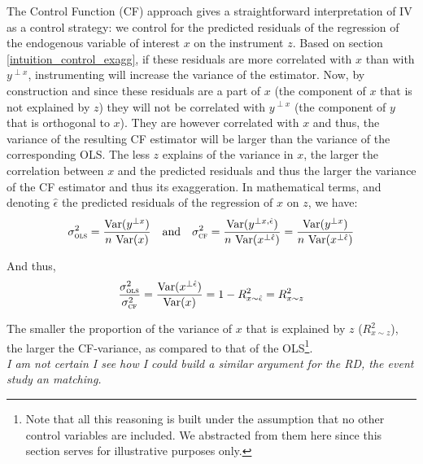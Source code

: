 \documentclass[a4paper, 11pt]{report}
\begin{document}
			The Control Function (CF) approach gives a straightforward interpretation of IV as a control strategy: we control for the predicted residuals of the regression of the endogenous variable of interest $x$ on the instrument $z$. Based on section \ref{intuition_control_exagg}, if these residuals are more correlated with $x$ than with $y^{\perp x}$, instrumenting will increase the variance of the estimator. Now, by construction and since these residuals are a part of $x$ (the component of $x$ that is not explained by $z$) they will not be correlated with $y^{\perp x}$ (the component of $y$ that is orthogonal to $x$). They are however correlated with $x$ and thus, the variance of the resulting CF estimator will be larger than the variance of the corresponding OLS. %
			The less $z$ explains of the variance in $x$, the larger the correlation between $x$ and the predicted residuals and thus the larger the variance of the CF estimator and thus its exaggeration. In mathematical terms, and denoting $\hat{\epsilon}$ the predicted residuals of the regression of $x$ on $z$, we have:
			~
			\[
				\sigma_{\textsc{ols}}^{2} = \dfrac{\text{Var}(y^{\perp x})}{n \ \text{Var}(x)} 
				\quad \text{and} \quad
				\sigma_{\textsc{cf}}^{2} = \dfrac{\text{Var}(y^{\perp x, \hat{\epsilon}})}{n \ \text{Var}(x^{\perp \hat{\epsilon}})} = \dfrac{\text{Var}(y^{\perp x})}{n \ \text{Var}(x^{\perp \hat{\epsilon}})}  
			\]
			
			And thus,
			~
			\[
				\dfrac{\sigma_{\textsc{ols}}^{2}}{\sigma_{\textsc{cf}}^{2}} = \dfrac{\text{Var}(x^{\perp \hat{\epsilon}})}{\text{Var}(x)} = 1 - R^{2}_{x \sim \hat{\epsilon}} = R^{2}_{x \sim z}
			\]
			
			The smaller the proportion of the variance of $x$ that is explained by $z$ ($R^{2}_{x \sim z}$), the larger the CF-variance, as compared to that of the OLS\footnote{Note that all this reasoning is built under the assumption that no other control variables are included. We abstracted from them here since this section serves for illustrative purposes only.}.\\
			
			\textit{I am not certain I see how I could build a similar argument for the RD, the event study an matching.}\\
			
			
			
\end{document}
